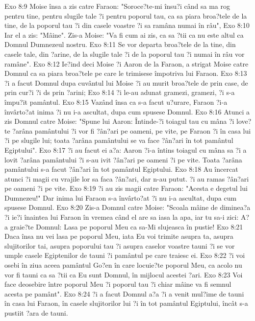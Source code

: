 Exo 8:9  Moise însa a zis catre Faraon: "Soroce?te-mi însu?i când sa ma rog pentru tine, pentru slugile tale ?i pentru poporul tau, ca sa piara broa?tele de la tine, de la poporul tau ?i din casele voastre ?i sa ramâna numai în râu",
Exo 8:10  Iar el a zis: "Mâine". Zis-a Moise: "Va fi cum ai zis, ca sa ?tii ca nu este altul ca Domnul Dumnezeul nostru.
Exo 8:11  Se vor departa broa?tele de la tine, din casele tale, din ?arine, de la slugile tale ?i de la poporul tau ?i numai în râu vor ramâne".
Exo 8:12  Ie?ind deci Moise ?i Aaron de la Faraon, a strigat Moise catre Domnul ca sa piara broa?tele pe care le trimisese împotriva lui Faraon.
Exo 8:13  ?i a facut Domnul dupa cuvântul lui Moise ?i au murit broa?tele de prin case, de prin cur?i ?i ds prin ?arini;
Exo 8:14  ?i le-au adunat gramezi, gramezi, ?i s-a împu?it pamântul.
Exo 8:15  Vazând însa ca s-a facut u?urare, Faraon ?i-a învârto?at inima ?i nu i-a ascultat, dupa cum spusese Domnul.
Exo 8:16  Atunci a zis Domnul catre Moise: "Spune lui Aaron: Întinde-?i toiagul tau cu mâna ?i love?te ?arâna pamântului ?i vor fi ?ân?ari pe oameni, pe vite, pe Faraon ?i în casa lui ?i pe slugile lui; toata ?arâna pamântului se va face ?ân?ari în tot pamântul Egiptului".
Exo 8:17  ?i au facut ei a?a: Aaron ?i-a întins toiagul cu mâna sa ?i a lovit ?arâna pamântului ?i s-au ivit ?ân?ari pe oameni ?i pe vite. Toata ?arâna pamântului s-a facut ?ân?ari în tot pamântul Egiptului.
Exo 8:18  Au încercat atunci ?i magii cu vrajile lor sa faca ?ân?ari, dar n-au putut. ?i au ramas ?ân?ari pe oameni ?i pe vite.
Exo 8:19  ?i au zis magii catre Faraon: "Acesta e degetul lui Dumnezeu!" Dar inima lui Faraon s-a învârto?at ?i nu i-a ascultat, dupa cum spusese Domnul.
Exo 8:20  Zis-a Domnul catre Moise: "Scoala mâine de diminea?a ?i ie?i înaintea lui Faraon în vremea când el are sa iasa la apa, iar tu sa-i zici: A?a graie?te Domnul: Lasa pe poporul Meu ca sa-Mi slujeasca în pustie!
Exo 8:21  Daca însa nu vei lasa pe poporul Meu, iata Eu voi trimite asupra ta, asupra slujitorilor tai, asupra poporului tau ?i asupra caselor voastre tauni ?i se vor umple casele Egiptenilor de tauni ?i pamântul pe care traiesc ei.
Exo 8:22  ?i voi osebi în ziua aceea pamântul Go?en în care locuie?te poporul Meu, ca acolo nu vor fi tauni ca sa ?tii ca Eu sunt Domnul, în mijlocul acestei ?ari.
Exo 8:23  Voi face deosebire între poporul Meu ?i poporul tau ?i chiar mâine va fi semnul acesta pe pamânt".
Exo 8:24  ?i a facut Domnul a?a ?i a venit mul?ime de tauni în casa lui Faraon, în casele slujitorilor lui ?i în tot pamântul Egiptului, încât s-a pustiit ?ara de tauni.
